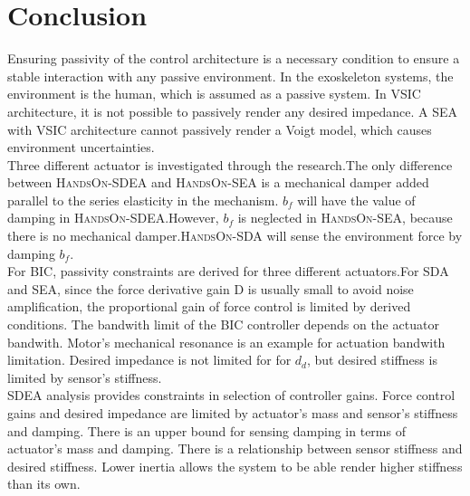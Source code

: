 \documentclass{article}
\begin{document}
\section{Conclusion}
Ensuring passivity of the control architecture is a necessary condition to ensure a stable interaction with any passive environment. In the exoskeleton systems, the environment is the human, which is assumed as a passive system\cite{hogan}. In VSIC architecture, it is not possible to passively render any desired impedance. A SEA with VSIC architecture cannot passively render a Voigt model\cite{tagliamonte}, which causes environment uncertainties\cite{calanca}.\\

Three different actuator is investigated through the research.The only difference between \textsc{HandsOn-SDEA} and \textsc{HandsOn-SEA} is a mechanical damper added parallel to the series elasticity in the mechanism. $b_f$ will have the value of damping in \textsc{HandsOn-SDEA}.However, $b_f$ is neglected in \textsc{HandsOn-SEA}, because there is no mechanical damper.\textsc{HandsOn-SDA} will sense the environment force by damping $b_f$.\\

For BIC, passivity constraints are derived for three different actuators.For SDA and SEA, since the force derivative gain D is usually small to avoid noise amplification, the proportional gain of force control is limited by derived conditions. The bandwith limit of the BIC controller depends on the actuator bandwith. Motor's mechanical resonance is an example for actuation bandwith limitation. Desired impedance is not limited for for $d_d$, but desired stiffness is limited by sensor's stiffness.\\

SDEA analysis provides constraints in selection of controller gains. Force control gains and desired impedance are limited by actuator's mass and sensor's stiffness and damping. There is an upper bound for sensing damping in terms of actuator's mass and damping. There is a relationship between sensor stiffness and desired stiffness. Lower inertia allows the system to be able render higher stiffness than its own.\\
\end{document}
